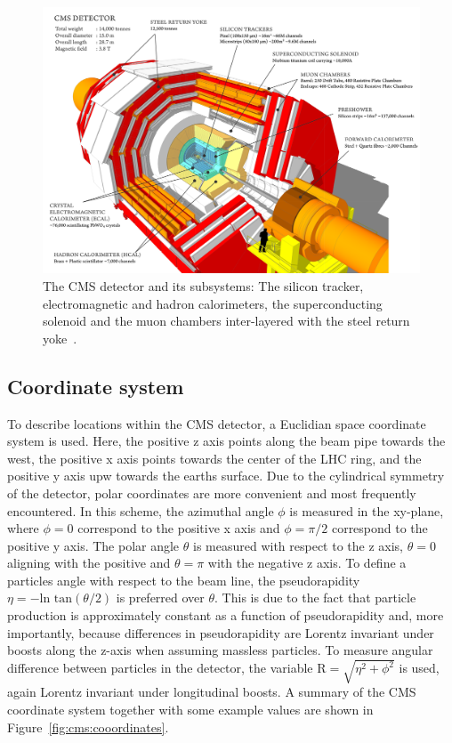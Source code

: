 \begin{figure}[h] 
    \centering
    \includegraphics[width=1.0\textwidth]{figures/cms/CMS.png}
    \caption{The CMS detector and its subsystems: The silicon tracker, electromagnetic and hadron calorimeters, the superconducting solenoid and the muon chambers inter-layered with the steel return yoke~\cite{CMS}.}
    \label{fig:cms:CMS}
\end{figure}

\subsection{Coordinate system}
To describe locations within the CMS detector, a Euclidian space coordinate system is used. Here, the positive z axis points along the beam pipe towards the west, the positive x axis points towards the center of the LHC ring, and the positive y axis upw towards the earths surface. Due to the cylindrical symmetry of the detector, polar coordinates are more convenient and most frequently encountered. In this scheme, the azimuthal angle $\phi$ is measured in the xy-plane, where $\phi=0$ correspond to the positive x axis and $\phi=\pi/2$ correspond to the positive y axis. The polar angle $\theta$ is measured with respect to the z axis, $\theta=0$ aligning with the positive and $\theta=\pi$ with the negative z axis.
To define a particles angle with respect to the beam line, the pseudorapidity $\eta = -\textrm{ln tan}(\theta/2)$ is preferred over $\theta$. This is due to the fact that particle production is approximately constant as a function of pseudorapidity and, more importantly, because differences in pseudorapidity are Lorentz invariant under boosts along the z-axis when assuming massless particles.
To measure angular difference between particles in the detector, the variable $\textrm{R}=\sqrt{\eta^2+\phi^2}$ is used, again Lorentz invariant under longitudinal boosts. A summary of the CMS coordinate system together with some example values are shown in Figure~\ref{fig:cms:cooordinates}.


